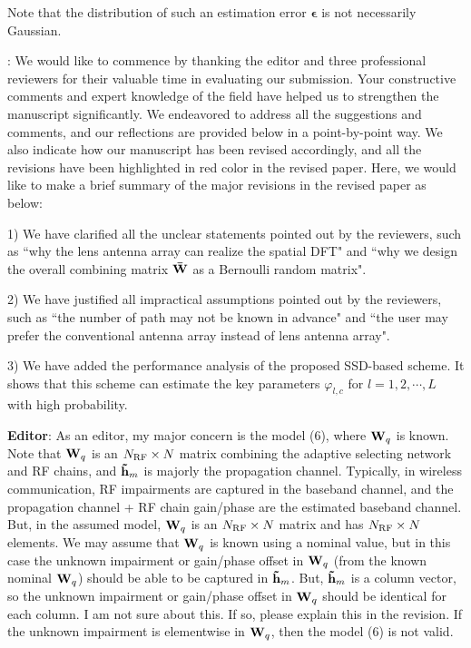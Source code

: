 \documentclass[a4paper,12pt]{article}
\begin{document}
Note that the distribution of such an estimation error ${\bm \epsilon}$ is not necessarily Gaussian. 



{: We would like to commence by thanking the editor and three professional reviewers for their valuable time in evaluating our submission. Your constructive comments and expert knowledge of the field have helped us to strengthen the manuscript significantly. We endeavored to address all the suggestions and comments, and our reflections are provided below in a point-by-point way. We also indicate how our manuscript has been revised accordingly, and all the revisions have been highlighted in {\color{red} red} color in the revised paper. Here, we would like to make a brief summary of the major revisions in the revised paper as below:

1) We have clarified all the unclear statements pointed out by the reviewers, such as ``why the lens antenna array can realize the spatial DFT" and ``why we design the overall combining matrix ${{{\bf{\bar W}}}}$ as a Bernoulli random matrix".

2) We have justified all impractical assumptions pointed out by the reviewers, such as ``the number of path may not be known in advance" and ``the user may prefer the conventional antenna array instead of lens antenna array".

3) We have added the performance analysis of the proposed SSD-based scheme. It shows that this scheme can estimate the key parameters ${{\varphi _{l,c}}}$ for ${l = 1,2, \cdots ,L}$ with high probability.
}

\textbf{Editor}: As an editor, my major concern is the model (6), where ${{{\bf{W}}_q}}$ is known. Note that ${{{\bf{W}}_q}}$ is an ${{N_{{\rm{RF}}}} \times N}$ matrix combining the adaptive selecting network and RF chains,  and ${{{\bf{\tilde h}}_m}}$ is majorly the propagation channel. Typically, in wireless communication, RF impairments are captured in the baseband channel, and the propagation channel + RF chain gain/phase are the estimated baseband channel. But, in the assumed model, ${{{\bf{W}}_q}}$ is an ${{N_{{\rm{RF}}}} \times N}$ matrix and has ${{N_{{\rm{RF}}}} \times N}$ elements. We may assume that ${{{\bf{W}}_q}}$ is known using a nominal value, but in this case the unknown impairment or gain/phase offset in ${{{\bf{W}}_q}}$ (from the known nominal ${{{\bf{W}}_q}}$) should be able to be captured in ${{{\bf{\tilde h}}_m}}$. But, ${{{\bf{\tilde h}}_m}}$ is a column vector, so the unknown impairment or gain/phase offset in ${{{\bf{W}}_q}}$ should be identical for each column. I am not sure about this. If so, please explain this in the revision.  If the unknown impairment is elementwise in ${{{\bf{W}}_q}}$, then the model (6) is not valid.
\end{document}
